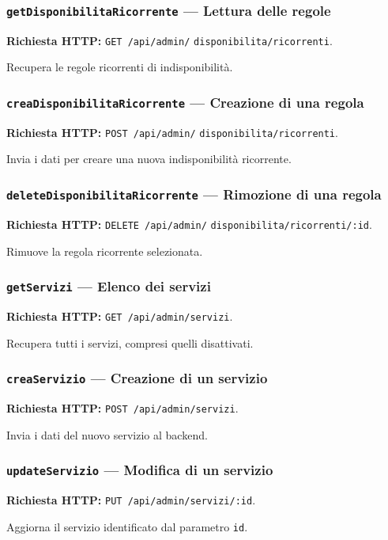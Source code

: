 \documentclass[12pt,a4paper]{article}
\begin{document}
\subsubsection{\texttt{getDisponibilitaRicorrente} --- Lettura delle regole}
\textbf{Richiesta HTTP:} \texttt{GET /api/admin/}\allowbreak
\texttt{disponibilita/ricorrenti}.

Recupera le regole ricorrenti di indisponibilità.

\subsubsection{\texttt{creaDisponibilitaRicorrente} --- Creazione di una regola}
\textbf{Richiesta HTTP:} \texttt{POST /api/admin/}\allowbreak
\texttt{disponibilita/ricorrenti}.

Invia i dati per creare una nuova indisponibilità ricorrente.

\subsubsection{\texttt{deleteDisponibilitaRicorrente} --- Rimozione di una regola}
\textbf{Richiesta HTTP:} \texttt{DELETE /api/admin/}\allowbreak
\texttt{disponibilita/ricorrenti/:id}.

Rimuove la regola ricorrente selezionata.

\subsubsection{\texttt{getServizi} --- Elenco dei servizi}
\textbf{Richiesta HTTP:} \texttt{GET /api/admin/servizi}.

Recupera tutti i servizi, compresi quelli disattivati.

\subsubsection{\texttt{creaServizio} --- Creazione di un servizio}
\textbf{Richiesta HTTP:} \texttt{POST /api/admin/servizi}.

Invia i dati del nuovo servizio al backend.

\subsubsection{\texttt{updateServizio} --- Modifica di un servizio}
\textbf{Richiesta HTTP:} \texttt{PUT /api/admin/servizi/:id}.

Aggiorna il servizio identificato dal parametro \texttt{id}.
\end{document}
